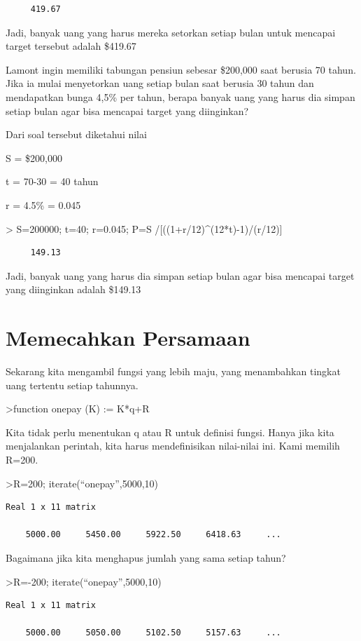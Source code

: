 \documentclass[
]{book}
\begin{document}
\begin{verbatim}
     419.67 
\end{verbatim}

Jadi, banyak uang yang harus mereka setorkan setiap bulan untuk mencapai target tersebut adalah \$419.67

Lamont ingin memiliki tabungan pensiun sebesar \$200,000 saat berusia 70 tahun. Jika ia mulai menyetorkan uang setiap bulan saat berusia 30 tahun dan mendapatkan bunga 4,5\% per tahun, berapa banyak uang yang harus dia simpan setiap bulan agar bisa mencapai target yang diinginkan?

Dari soal tersebut diketahui nilai

S = \$200,000

t = 70-30 = 40 tahun

r = 4.5\% = 0.045

\textgreater{} S=200000; t=40; r=0.045; P=S /{[}((1+r/12)\^{}(12*t)-1)/(r/12){]}

\begin{verbatim}
     149.13 
\end{verbatim}

Jadi, banyak uang yang harus dia simpan setiap bulan agar bisa mencapai target yang diinginkan adalah \$149.13

\chapter{Memecahkan Persamaan}\label{memecahkan-persamaan}

Sekarang kita mengambil fungsi yang lebih maju, yang menambahkan tingkat uang tertentu setiap tahunnya.

\textgreater function onepay (K) := K*q+R

Kita tidak perlu menentukan q atau R untuk definisi fungsi. Hanya jika kita menjalankan perintah, kita harus mendefinisikan nilai-nilai ini. Kami memilih R=200.

\textgreater R=200; iterate(``onepay'',5000,10)

\begin{verbatim}
Real 1 x 11 matrix

    5000.00     5450.00     5922.50     6418.63     ...
\end{verbatim}

Bagaimana jika kita menghapus jumlah yang sama setiap tahun?

\textgreater R=-200; iterate(``onepay'',5000,10)

\begin{verbatim}
Real 1 x 11 matrix

    5000.00     5050.00     5102.50     5157.63     ...
\end{verbatim}
\end{document}
